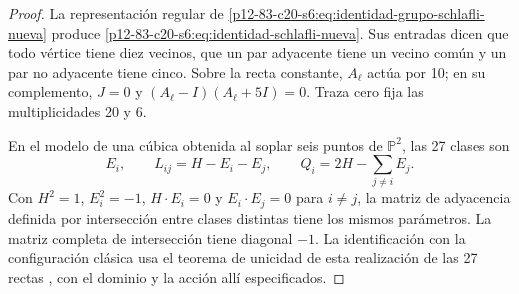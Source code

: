 \begin{proof}
La representación regular de
\cref{p12-83-c20-s6:eq:identidad-grupo-schlafli-nueva} produce
\cref{p12-83-c20-s6:eq:identidad-schlafli-nueva}. Sus entradas dicen que todo vértice
tiene diez vecinos, que un par adyacente tiene un vecino común y un par no
adyacente tiene cinco. Sobre la recta constante, \(A_\ell\) actúa por 10;
en su complemento, \(J=0\) y
\((A_\ell-I)(A_\ell+5I)=0\). Traza cero fija las multiplicidades 20 y 6.

En el modelo de una cúbica obtenida al soplar seis puntos de
\(\mathbb P^2\), las 27 clases son
\[
 E_i,\qquad L_{ij}=H-E_i-E_j,\qquad
 Q_i=2H-\sum_{j\ne i}E_j.
\]
Con \(H^2=1\), \(E_i^2=-1\), \(H\cdot E_i=0\) y
\(E_i\cdot E_j=0\) para \(i\ne j\), la matriz de adyacencia definida
por intersección entre clases distintas tiene los mismos parámetros.
La matriz completa de intersección tiene diagonal \(-1\).
La identificación con la configuración clásica usa el
teorema de unicidad de esta realización de las 27 rectas
\cite{Manivel2005}, con el dominio y la acción allí especificados.
\end{proof}

